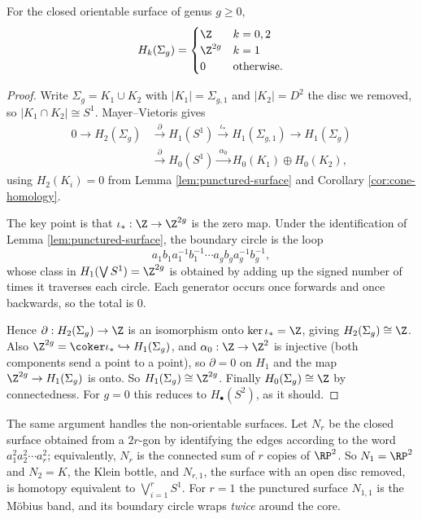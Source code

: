 \begin{theorem} \label{thm:genus-homology}
	For the closed orientable surface of genus $g \geq 0$,
	$$
	H_k(\Sigma_g) = \begin{cases}\Z & k = 0, 2\\ \Z^{2g} & k = 1\\ 0 & \text{otherwise.}\end{cases}
	$$
\end{theorem}
\begin{proof}
	Write $\Sigma_g = K_1 \cup K_2$ with $|K_1| = \Sigma_{g,1}$ and $|K_2| = D^2$ the disc we removed, so $|K_1\cap K_2| \cong S^1$. Mayer--Vietoris gives
	\begin{align*}
		0 \to H_2(\Sigma_g) &\xrightarrow{\ \partial\ } H_1(S^1) \xrightarrow{\ \iota_*\ } H_1(\Sigma_{g,1}) \to H_1(\Sigma_g)\\
		&\xrightarrow{\ \partial\ } H_0(S^1) \xrightarrow{\ \alpha_0\ } H_0(K_1)\oplus H_0(K_2),
	\end{align*}
	using $H_2(K_i) = 0$ from Lemma \ref{lem:punctured-surface} and Corollary \ref{cor:cone-homology}.

	The key point is that $\iota_*: \Z\to\Z^{2g}$ is the zero map. Under the identification of Lemma \ref{lem:punctured-surface}, the boundary circle is the loop
	$$
	a_1b_1a_1^{-1}b_1^{-1}\cdots a_gb_ga_g^{-1}b_g^{-1},
	$$
	whose class in $H_1(\bigvee S^1) = \Z^{2g}$ is obtained by adding up the signed number of times it traverses each circle. Each generator occurs once forwards and once backwards, so the total is $0$.

	Hence $\partial: H_2(\Sigma_g)\to\Z$ is an isomorphism onto $\ker\iota_* = \Z$, giving $H_2(\Sigma_g)\cong\Z$. Also $\Z^{2g} = \coker\iota_* \hookrightarrow H_1(\Sigma_g)$, and $\alpha_0: \Z\to\Z^2$ is injective (both components send a point to a point), so $\partial = 0$ on $H_1$ and the map $\Z^{2g}\to H_1(\Sigma_g)$ is onto. So $H_1(\Sigma_g)\cong\Z^{2g}$. Finally $H_0(\Sigma_g)\cong\Z$ by connectedness. For $g = 0$ this reduces to $H_\bullet(S^2)$, as it should.
\end{proof}

The same argument handles the non-orientable surfaces. Let $N_r$ be the closed surface
obtained from a $2r$-gon by identifying the edges according to the word
$a_1^2a_2^2\cdots a_r^2$; equivalently, $N_r$ is the connected sum of $r$ copies of
$\RP^2$. So $N_1 = \RP^2$ and $N_2 = K$, the Klein bottle, and $N_{r,1}$, the surface with
an open disc removed, is homotopy equivalent to $\bigvee_{i=1}^r S^1$. For $r = 1$ the
punctured surface $N_{1,1}$ is the M\"obius band, and its boundary circle wraps
\emph{twice} around the core.

